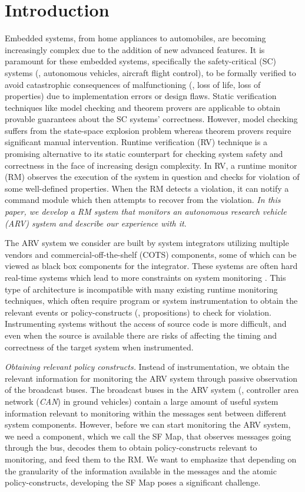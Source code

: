 \section{Introduction}
Embedded systems, from home appliances to automobiles, are becoming increasingly complex due to the addition of new advanced features. 
It is paramount for these embedded systems, specifically the safety-critical (SC) systems (\eg, autonomous vehicles, aircraft flight control),  
to be formally verified to avoid catastrophic consequences  of malfunctioning (\eg, loss of life, loss of properties) due to implementation errors or 
design flaws. Static verification techniques like model checking and theorem provers are applicable to obtain provable guarantees about the SC systems' 
correctness. However, model checking suffers from the state-space explosion problem whereas theorem provers require significant manual intervention.  
Runtime verification (RV) technique is a promising alternative to its static counterpart for checking system safety and correctness in the face of 
increasing design complexity. 
In RV,  a runtime monitor (RM) observes the execution of the system in question and checks for violation of some well-defined properties. 
When the RM detects a violation, it can notify a command module which then attempts to recover from the violation. \emph{In this paper, we develop a 
RM system that monitors an autonomous research vehicle (ARV) system and describe our experience with it}.

The ARV system we consider are built by system integrators 
utilizing multiple vendors and commercial-off-the-shelf (COTS) components, some of which can be 
viewed as black box components for the integrator. 
These systems are often  hard real-time systems which lead to more constraints on 
system monitoring \cite{Goodloe2010}. This type of architecture is incompatible with many 
existing runtime monitoring techniques, which often require program or system instrumentation \cite{} to obtain 
the relevant events or policy-constructs (\eg, propositions) to check for violation. 
Instrumenting systems without the access of source code  is more difficult, 
and even when the source  is available there are risks of affecting the timing and 
correctness of the target system when instrumented.

\emph{Obtaining relevant policy constructs. }Instead of instrumentation, we obtain the relevant information for monitoring the ARV system through passive observation 
of the broadcast buses. The broadcast buses in the ARV system (\eg, controller area network (\textit{CAN}) in ground vehicles) 
 contain a large amount of useful system information relevant to monitoring 
within the messages sent between different system components. However, before we can start 
monitoring the ARV system, we need a component, which we call the \textsf{SF Map}, that 
observes messages going through the bus, decodes them to obtain policy-constructs 
relevant to monitoring, and feed them to the RM. We want to emphasize that depending on the granularity 
of the information available in the messages and the atomic policy-constructs, developing the \textsf{SF Map} 
poses a significant challenge. 

